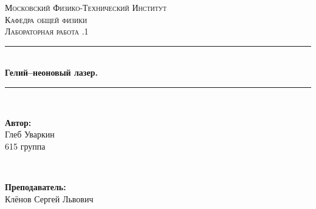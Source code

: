 \documentclass[a4paper, 12pt, twoside]{article}
\begin{document}
	\begin{titlepage}
		
		\newcommand{\HRule}{\rule{\linewidth}{0.7mm}} %
		
		\center %
		
		
		\textsc{\LARGE Московский Физико-Технический Институт}\\[1,5cm] %
		\textsc{\Large Кафедра общей физики}\\[0.5cm] %
		\textsc{\large Лабораторная работа .1}\\[0.5cm] %
		
		
		\HRule
		\\[0.4cm]
		{ \huge \bfseries Гелий--неоновый лазер.}
		\\[0.2cm] %
		\HRule
		\\[1.5cm]
		
		
		
		
		\begin{minipage}{0.4\textwidth}
			\begin{flushleft} \large
				\textbf{Автор:}\\
				Глеб Уваркин \\
				615 группа
			\end{flushleft}
		\end{minipage}
		~
		\begin{minipage}{0.4\textwidth}
			\begin{flushright} \large
				\textbf {Преподаватель:} \\
				Клёнов Сергей Львович %
			\end{flushright}
		\end{minipage}
		

\end{titlepage}
\end{document}
